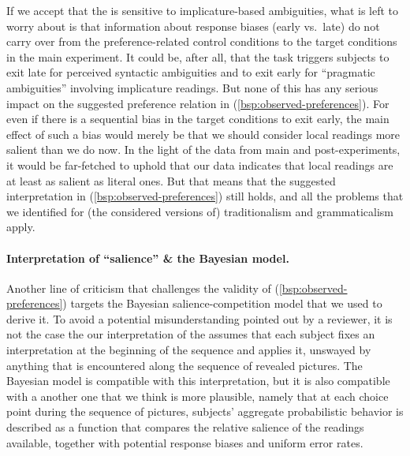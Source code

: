 \documentclass[fleqn,reqno,10pt]{article}
\newcommand{\as}{\acro{as}}
\renewcommand{\es}{\acro{es}}
\newcommand{\ivt}{\acro{ivt}}
\begin{document}
If we accept that the \ivt is sensitive to implicature-based
ambiguities, what is left to worry about is that information about
response biases (early vs.~late) do not carry over from the
preference-related control conditions to the target conditions in the
main experiment. It could be, after all, that the task triggers
subjects to exit late for perceived syntactic ambiguities and to exit
early for ``pragmatic ambiguities'' involving implicature
readings. But none of this has any serious impact on the suggested
preference relation in (\ref{bsp:observed-preferences}). For even if
there is a sequential bias in the target conditions to exit early, the
main effect of such a bias would merely be that we should consider
local readings more salient than we do now. In the light of the data
from main and post-experiments, it would be far-fetched to uphold that
our data indicates that local readings are at least as salient as
literal ones. But that means that the suggested interpretation in
(\ref{bsp:observed-preferences}) still holds, and all the problems
that we identified for (the considered versions of) traditionalism and
grammaticalism apply.


\paragraph{Interpretation of ``salience'' \& the Bayesian model.}
Another line of criticism that challenges the validity of
(\ref{bsp:observed-preferences}) targets the Bayesian
salience-competition model that we used to derive it. To avoid a
potential misunderstanding pointed out by a reviewer, it is not the
case the our interpretation of the \ivt assumes that each subject
fixes an interpretation at the beginning of the sequence and applies
it, unswayed by anything that is encountered along the sequence of
revealed pictures. The Bayesian model is compatible with this
interpretation, but it is also compatible with a another one that we
think is more plausible, namely that at each choice point during the
sequence of pictures, subjects' aggregate probabilistic behavior is
described as a function that compares the relative salience of the
readings available, together with potential response biases and
uniform error rates. 
\end{document}
